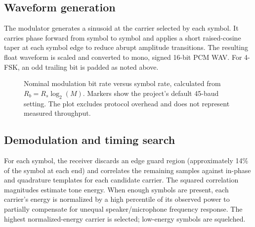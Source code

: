 \documentclass[11pt,a4paper]{article}
\begin{document}
\subsection{Waveform generation}
The modulator generates a sinusoid at the carrier selected by each symbol. It carries phase forward from symbol to symbol and applies a short raised-cosine taper at each symbol edge to reduce abrupt amplitude transitions. The resulting float waveform is scaled and converted to mono, signed 16-bit PCM WAV. For 4-FSK, an odd trailing bit is padded as noted above.

\begin{figure}[ht]
\centering
{}
\caption{Nominal modulation bit rate versus symbol rate, calculated from $R_b=R_s\log_2(M)$. Markers show the project's default 45-baud setting. The plot excludes protocol overhead and does not represent measured throughput.}
\label{fig:rate}
\end{figure}

\subsection{Demodulation and timing search}
For each symbol, the receiver discards an edge guard region (approximately 14\% of the symbol at each end) and correlates the remaining samples against in-phase and quadrature templates for each candidate carrier. The squared correlation magnitudes estimate tone energy. When enough symbols are present, each carrier's energy is normalized by a high percentile of its observed power to partially compensate for unequal speaker/microphone frequency response. The highest normalized-energy carrier is selected; low-energy symbols are squelched.
\end{document}

